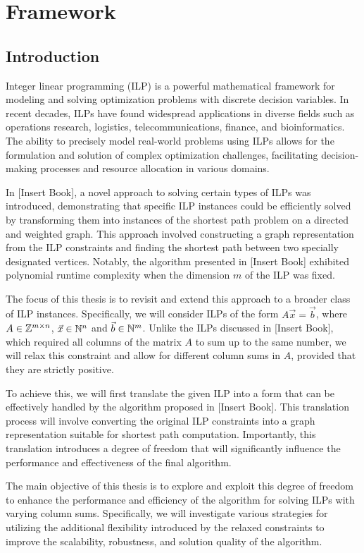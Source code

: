 \chapter{Framework}
\section{Introduction}
Integer linear programming (ILP) is a powerful mathematical framework for modeling and solving optimization problems with discrete decision variables. In recent decades, ILPs have found widespread applications in diverse fields such as operations research, logistics, telecommunications, finance, and bioinformatics. The ability to precisely model real-world problems using ILPs allows for the formulation and solution of complex optimization challenges, facilitating decision-making processes and resource allocation in various domains.

In [Insert Book], a novel approach to solving certain types of ILPs was introduced, demonstrating that specific ILP instances could be efficiently solved by transforming them into instances of the shortest path problem on a directed and weighted graph. This approach involved constructing a graph representation from the ILP constraints and finding the shortest path between two specially designated vertices. Notably, the algorithm presented in [Insert Book] exhibited polynomial runtime complexity when the dimension $m$ of the ILP was fixed.

The focus of this thesis is to revisit and extend this approach to a broader class of ILP instances. Specifically, we will consider ILPs of the form $A\vec x = \vec b$, where $A\in \mathbb{Z}^{m \times n}$,  $\vec x \in \mathbb{N}^n$ and $\vec b \in \mathbb{N}^m$. Unlike the ILPs discussed in [Insert Book], which required all columns of the matrix $A$ to sum up to the same number, we will relax this constraint and allow for different column sums in $A$, provided that they are strictly positive.

To achieve this, we will first translate the given ILP into a form that can be effectively handled by the algorithm proposed in [Insert Book]. This translation process will involve converting the original ILP constraints into a graph representation suitable for shortest path computation. Importantly, this translation introduces a degree of freedom that will significantly influence the performance and effectiveness of the final algorithm.

The main objective of this thesis is to explore and exploit this degree of freedom to enhance the performance and efficiency of the algorithm for solving ILPs with varying column sums. Specifically, we will investigate various strategies for utilizing the additional flexibility introduced by the relaxed constraints to improve the scalability, robustness, and solution quality of the algorithm.

